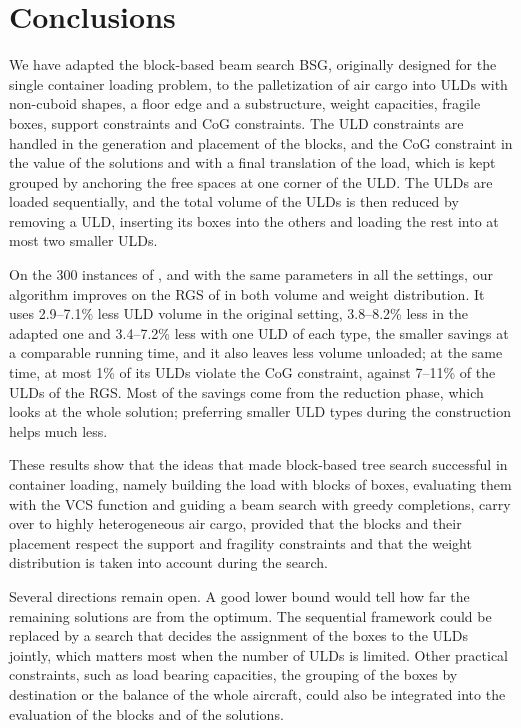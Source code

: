 \section{Conclusions}
\label{sec:conclusions}

We have adapted the block-based beam search BSG, originally designed for the single container
loading problem, to the palletization of air cargo into ULDs with non-cuboid shapes, a floor
edge and a substructure, weight capacities, fragile boxes, support constraints and CoG
constraints. The ULD constraints are handled in the generation and placement of the blocks, and
the CoG constraint in the value of the solutions and with a final
translation of the load, which is kept grouped by anchoring the free spaces at one corner of the
ULD. The ULDs are loaded sequentially, and the total volume of the ULDs is then reduced by
removing a ULD, inserting its boxes into the others and loading the rest into at most two smaller
ULDs.

On the 300 instances of \citet{Paquay2018b}, and with the same parameters in all the settings,
our algorithm improves on the RGS of \citet{Hessler2025} in both volume and weight distribution.
It uses 2.9--7.1\% less ULD volume in the original setting, 3.8--8.2\% less in the adapted one
and 3.4--7.2\% less with one ULD of each type, the smaller savings at a comparable running time,
and it also leaves less volume unloaded; at the same time, at most 1\% of its ULDs violate the
CoG constraint, against 7--11\% of the ULDs of the RGS. Most of the savings come from the reduction phase,
which looks at the whole solution; preferring smaller ULD types during the construction helps
much less.

These results show that the ideas that made block-based tree search successful in container
loading, namely building the load with blocks of boxes, evaluating them with the VCS function
and guiding a beam search with greedy completions, carry over to highly heterogeneous air
cargo, provided that the blocks and their placement respect the support and fragility
constraints and that the weight distribution is taken into account during the search.

Several directions remain open. A good lower bound would tell how far the remaining
solutions are from the optimum. The sequential framework could be replaced by a search that
decides the assignment of the boxes to the ULDs jointly, which matters most when the number of
ULDs is limited. Other practical constraints, such as load bearing capacities, the grouping of
the boxes by destination or the balance of the whole aircraft, could also be integrated into
the evaluation of the blocks and of the solutions.
